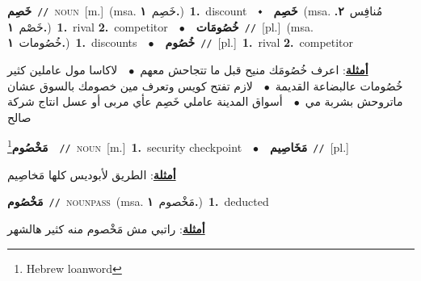 \documentclass[10pt,a4paper,twoside]{article} %
\begin{document}
\begin{multicols}{2}
{\setlength\topsep{0pt}\textbf{\foreignlanguage{arabic}{خَصِم}}\ {\color{gray}\texttt{//}\color{black}}\ \textsc{noun}\ [m.]\ \color{gray}(msa. \foreignlanguage{arabic}{خَصِم}~\foreignlanguage{arabic}{\textbf{١.}})\color{black}\ \textbf{1.}~discount\ \ $\smblkdiamond$\ \ \setlength\topsep{0pt}\textbf{\foreignlanguage{arabic}{خَصِم}}\ \color{gray}(msa. \foreignlanguage{arabic}{مُنافِس}~\foreignlanguage{arabic}{\textbf{٢.}}  \foreignlanguage{arabic}{خَصْم}~\foreignlanguage{arabic}{\textbf{١.}})\color{black}\ \textbf{1.}~rival  \textbf{2.}~competitor\ \ $\bullet$\ \ \setlength\topsep{0pt}\textbf{\foreignlanguage{arabic}{خُصُومَات}}\ {\color{gray}\texttt{//}\color{black}}\ [pl.]\ \color{gray}(msa. \foreignlanguage{arabic}{خُصُومات}~\foreignlanguage{arabic}{\textbf{١.}})\color{black}\ \textbf{1.}~discounts\ \ $\bullet$\ \ \setlength\topsep{0pt}\textbf{\foreignlanguage{arabic}{خُصُوم}}\ {\color{gray}\texttt{//}\color{black}}\ [pl.]\ \textbf{1.}~rival  \textbf{2.}~competitor\  \begin{flushright}\color{gray}\foreignlanguage{arabic}{\textbf{\underline{\foreignlanguage{arabic}{أمثلة}}}: اعرف خُصُومَك منيح قبل ما تتجاحش معهم\ $\bullet$\ \  لاكاسا مول عاملين كثير خُصُومات عالبضاعة القديمة\ $\bullet$\ \  لازم تفتح كويس وتعرف مين خصومك بالسوق عشان ماتروحش بشربة مي\ $\bullet$\ \  أسواق المدينة عاملي خَصِم عأي مربى أو عسل انتاج شركة صالح}\end{flushright}\color{black}} \vspace{2mm}

{\setlength\topsep{0pt}\textbf{\foreignlanguage{arabic}{مَخْصُوم}}\footnote{Hebrew loanword}\ \ {\color{gray}\texttt{//}\color{black}}\ \textsc{noun}\ [m.]\ \textbf{1.}~security checkpoint\ \ $\bullet$\ \ \setlength\topsep{0pt}\textbf{\foreignlanguage{arabic}{مَخَاصِيم}}\ {\color{gray}\texttt{//}\color{black}}\ [pl.]\  \begin{flushright}\color{gray}\foreignlanguage{arabic}{\textbf{\underline{\foreignlanguage{arabic}{أمثلة}}}: الطريق لأبوديس كلها مَخاصِيم}\end{flushright}\color{black}} \vspace{2mm}

{\setlength\topsep{0pt}\textbf{\foreignlanguage{arabic}{مَخْصُوم}}\ {\color{gray}\texttt{//}\color{black}}\ \textsc{noun\textunderscore pass}\ \color{gray}(msa. \foreignlanguage{arabic}{مَخْصوم}~\foreignlanguage{arabic}{\textbf{١.}})\color{black}\ \textbf{1.}~deducted\  \begin{flushright}\color{gray}\foreignlanguage{arabic}{\textbf{\underline{\foreignlanguage{arabic}{أمثلة}}}: راتبي مش مَخْصوم منه كثير هالشهر}\end{flushright}\color{black}} \vspace{2mm}


\end{multicols}
\end{document}
